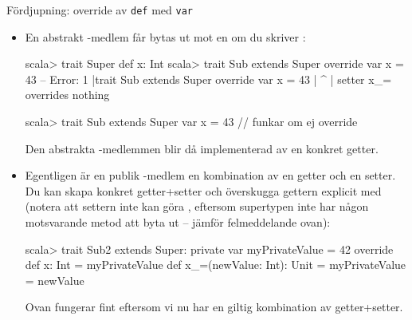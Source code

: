\begin{Slide}{Fördjupning: override av \texttt{def} med \texttt{var}}\SlideFontTiny
\begin{itemize}
\item En abstrakt -medlem får bytas ut mot en  om du  skriver :
\begin{REPLsmall}
scala> trait Super { def x: Int }
scala> trait Sub extends Super { override var x = 43 }
-- Error:
1 |trait Sub extends Super { override var x = 43 }
  |                                       ^
  |                                       setter x_= overrides nothing

scala> trait Sub extends Super { var x = 43 }   // funkar om ej override
\end{REPLsmall}
Den abstrakta -medlemmen blir då implementerad av en konkret getter. 
\item Egentligen är en publik -medlem en kombination av en getter och en setter. Du kan skapa konkret getter+setter och överskugga gettern explicit med  (notera att settern inte kan göra , eftersom supertypen inte har någon motsvarande metod att byta ut -- jämför felmeddelande ovan):
\begin{REPLsmall}
scala> trait Sub2 extends Super:
         private var myPrivateValue = 42
         override def x: Int = myPrivateValue
         def x_=(newValue: Int): Unit = myPrivateValue = newValue
\end{REPLsmall}
Ovan fungerar fint eftersom vi nu har en giltig kombination av getter+setter.
\end{itemize}
\end{Slide}


